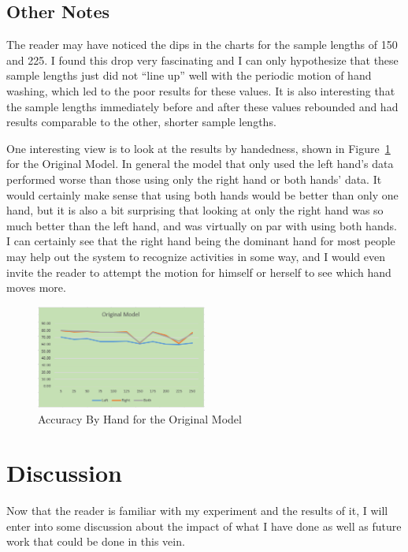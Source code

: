 \documentclass[]{report}
\begin{document}
\section{Other Notes}

The reader may have noticed the dips in the charts for the sample lengths of 150 and 225. I found this drop very fascinating and I can only hypothesize that these sample lengths just did not ``line up'' well with the periodic motion of hand washing, which led to the poor results for these values. It is also interesting that the sample lengths immediately before and after these values rebounded and had results comparable to the other, shorter sample lengths.

One interesting view is to look at the results by handedness, shown in Figure~\ref{handedness-original} for the Original Model. In general the model that only used the left hand's data performed worse than those using only the right hand or both hands' data. It would certainly make sense that using both hands would be better than only one hand, but it is also a bit surprising that looking at only the right hand was so much better than the left hand, and was virtually on par with using both hands. I can certainly see that the right hand being the dominant hand for most people may help out the system to recognize activities in some way, and I would even invite the reader to attempt the motion for himself or herself to see which hand moves more.

\begin{figure}
	\centering
	\includegraphics[width=0.5\textwidth]{../images/handed-original}
	\caption{Accuracy By Hand for the Original Model}
	\label{handedness-original}
\end{figure}


\chapter{Discussion}

Now that the reader is familiar with my experiment and the results of it, I will enter into some discussion about the impact of what I have done as well as future work that could be done in this vein.
\end{document}
